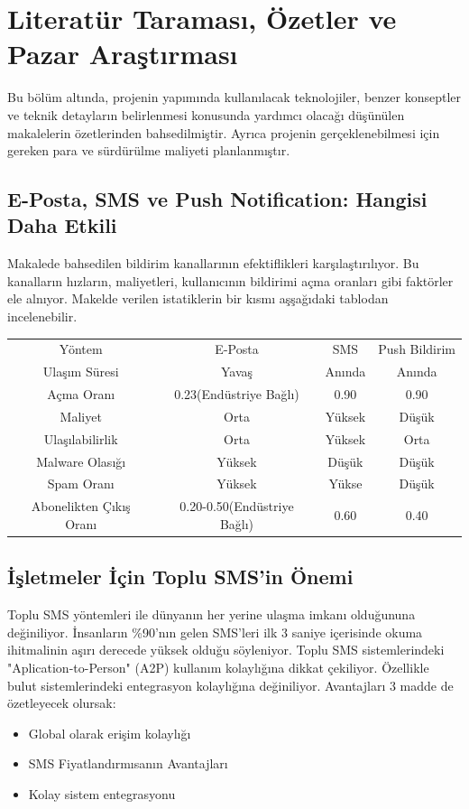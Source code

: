 \section{Literatür Taraması, Özetler ve Pazar Araştırması}
Bu bölüm altında, projenin yapımında kullanılacak teknolojiler, benzer konseptler ve teknik detayların belirlenmesi konusunda yardımcı olacağı düşünülen makalelerin özetlerinden bahsedilmiştir. Ayrıca projenin gerçeklenebilmesi için gereken para ve sürdürülme maliyeti planlanmıştır.
\subsection{E-Posta, SMS ve Push Notification: Hangisi Daha Etkili}
Makalede bahsedilen bildirim kanallarının efektiflikleri karşılaştırılıyor. Bu kanalların hızların, maliyetleri, kullanıcının bildirimi açma oranları gibi faktörler ele alnıyor. Makelde verilen istatiklerin bir kısmı aşşağıdaki tablodan incelenebilir.\cite{socilamediatoday}
\begin{center}
\begin{tabular}{ c | c | c | c }
 Yöntem & E-Posta & SMS & Push Bildirim \\ 
 Ulaşım Süresi & Yavaş & Anında & Anında  \\  
 Açma Oranı & 0.23(Endüstriye Bağlı) & 0.90 & 0.90  \\
 Maliyet & Orta & Yüksek & Düşük \\
 Ulaşılabilirlik & Orta & Yüksek & Orta \\
 Malware Olasığı & Yüksek & Düşük & Düşük \\
 Spam Oranı & Yüksek & Yükse & Düşük \\
 Abonelikten Çıkış Oranı & 0.20-0.50(Endüstriye Bağlı) & 0.60 & 0.40 
\end{tabular}
\end{center}

\subsection{İşletmeler İçin Toplu SMS'in Önemi}
Toplu SMS yöntemleri ile dünyanın her yerine ulaşma imkanı olduğununa değiniliyor. İnsanların \%90'nın gelen SMS'leri ilk 3 saniye içerisinde okuma ihitmalinin aşırı derecede yüksek olduğu söyleniyor. Toplu SMS sistemlerindeki "Aplication-to-Person" (A2P) kullanım kolaylığına dikkat çekiliyor. Özellikle bulut sistemlerindeki entegrasyon kolaylığına değiniliyor.\cite{clickatell} Avantajları 3 madde de özetleyecek olursak:
\begin{itemize}
  \item Global olarak erişim kolaylığı
  \item SMS Fiyatlandırmısanın Avantajları
  \item Kolay sistem entegrasyonu
\end{itemize}
